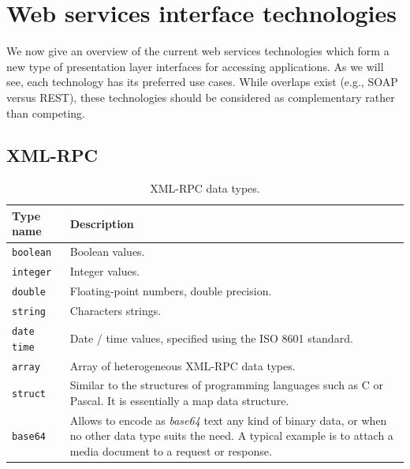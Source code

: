 \section{Web services interface technologies}


We now give an overview of the current web services technologies which form a new type of presentation layer interfaces for accessing applications. As we will see, each technology has its preferred use cases. While overlaps exist (e.g., SOAP versus REST), these technologies should be considered as complementary rather than competing.\\


\subsection{XML-RPC}


\begin{table}[htbp]
\centering
\begin{tabular}{| p{} | p{} |}

\hline

\textbf{Type name} & \textbf{Description} \\ \hline

\texttt{boolean} & Boolean values. \\ \hline

\texttt{integer} & Integer values. \\ \hline

\texttt{double} & Floating-point numbers, double precision. \\ \hline

\texttt{string} & Characters strings. \\ \hline

\texttt{date time} & Date / time values, specified using the ISO 8601 standard. \\ \hline

\texttt{array} & Array of heterogeneous XML-RPC data types. \\ \hline

\texttt{struct} & Similar to the structures of programming languages such as C or Pascal. It is essentially a map data structure. \\ \hline

\texttt{base64} & Allows to encode as \emph{base64} text any kind of binary data, or when no other data type suits the need. A typical example is to attach a media document to a request or response. \\ \hline

\end{tabular}
\caption{XML-RPC data types.}
\label{tab:xmlrpc-datatypes}
\end{table}


